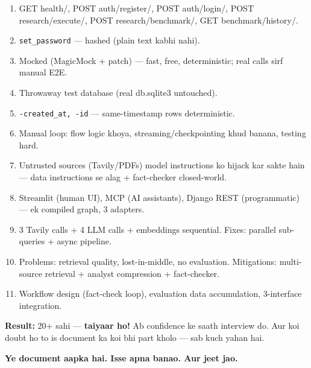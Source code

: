 \begin{enumerate}[label=\arabic*.]
\item GET health/, POST auth/register/, POST auth/login/, POST research/execute/, POST research/benchmark/, GET benchmark/history/.
\item \texttt{set\_password} --- hashed (plain text kabhi nahi).
\item Mocked (MagicMock + patch) --- fast, free, deterministic; real calls sirf manual E2E.
\item Throwaway test database (real db.sqlite3 untouched).
\item \texttt{-created\_at, -id} --- same-timestamp rows deterministic.
\item Manual loop: flow logic khoya, streaming/checkpointing khud banana, testing hard.
\item Untrusted sources (Tavily/PDFs) model instructions ko hijack kar sakte hain --- data instructions se alag + fact-checker closed-world.
\item Streamlit (human UI), MCP (AI assistants), Django REST (programmatic) --- ek compiled graph, 3 adapters.
\item 3 Tavily calls + 4 LLM calls + embeddings sequential. Fixes: parallel sub-queries + async pipeline.
\item Problems: retrieval quality, lost-in-middle, no evaluation. Mitigations: multi-source retrieval + analyst compression + fact-checker.
\item Workflow design (fact-check loop), evaluation data accumulation, 3-interface integration.
\end{enumerate}

\begin{storybox}
\textbf{Result:} 20+ sahi --- \textbf{taiyaar ho!} Ab confidence ke saath interview do. Aur koi doubt ho to is document ka koi bhi part kholo --- sab kuch yahan hai.

\textbf{Ye document aapka hai. Isse apna banao. Aur jeet jao.} \faRocket \faTrophy
\end{storybox}
